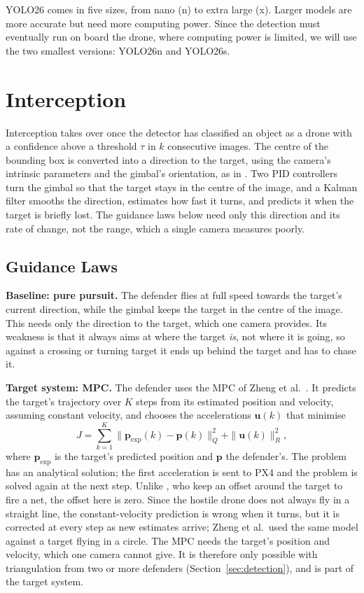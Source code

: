 \documentclass{article}
\begin{document}
YOLO26 comes in five sizes, from nano (n) to extra large (x). Larger models are more accurate but need more computing power. Since the detection must eventually run on board the drone, where computing power is limited, we will use the two smallest versions: YOLO26n and YOLO26s.





\newpage
\section{Interception}\label{sec:intercept}
Interception takes over once the detector has classified an object as a
drone with a confidence above a threshold $\tau$ in $k$ consecutive images. The centre of the bounding box is converted into a direction
to the target, using the camera's intrinsic parameters and the gimbal's
orientation, as in \cite{zheng2025mcm}. Two PID controllers turn the gimbal so
that the target stays in the centre of the image, and a Kalman filter smooths
the direction, estimates how fast it turns, and predicts it when the target
is briefly lost. The guidance laws below need only this direction and its
rate of change, not the range, which a single camera measures poorly.

\subsection{Guidance Laws}

\textbf{Baseline: pure pursuit.} The defender flies at full speed towards the
target's current direction, while the gimbal keeps the target in the centre
of the image. This needs only the direction to the target, which one camera
provides. Its weakness is that it always aims at where the target \emph{is},
not where it is going, so against a crossing or turning target it ends up
behind the target and has to chase it.

\textbf{Target system: MPC.} The defender uses the MPC of Zheng et al.\
\cite{zheng2025mcm}. It predicts the target's trajectory over $K$ steps from
its estimated position and velocity, assuming constant velocity, and chooses
the accelerations $\mathbf{u}(k)$ that minimise
\begin{equation}
  J = \sum_{k=1}^{K} \|\mathbf{p}_{\mathrm{exp}}(k) - \mathbf{p}(k)\|^2_{Q}
      + \|\mathbf{u}(k)\|^2_{R},
\end{equation}
where $\mathbf{p}_{\mathrm{exp}}$ is the target's predicted position and
$\mathbf{p}$ the defender's. The problem has an analytical solution; the
first acceleration is sent to PX4 and the problem is solved again at the next
step. Unlike \cite{zheng2025mcm}, who keep an offset around the target to fire
a net, the offset here is zero. Since the hostile drone does not always fly
in a straight line, the constant-velocity prediction is wrong when it turns,
but it is corrected at every step as new estimates arrive; Zheng et al.\
used the same model against a target flying in a circle. The MPC needs the
target's position and velocity, which one camera cannot give. It is therefore
only possible with triangulation from two or more defenders
(Section~\ref{sec:detection}), and is part of the target system.
\end{document}
